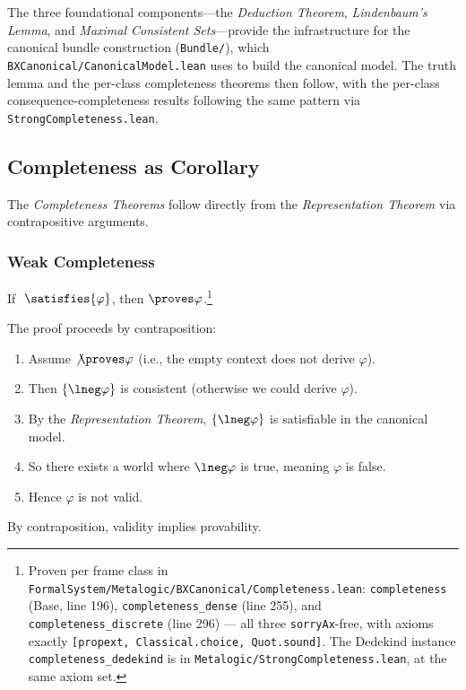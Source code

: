 \documentclass[../BimodalReference.tex]{subfiles}
\begin{document}
The three foundational components---the \emph{Deduction Theorem}, \emph{Lindenbaum's Lemma}, and \emph{Maximal Consistent Sets}---provide the infrastructure for the canonical bundle construction (\texttt{Bundle/}), which \texttt{BXCanonical/CanonicalModel.lean} uses to build the canonical model.
The truth lemma and the per-class completeness theorems then follow, with the per-class consequence-completeness results following the same pattern via \texttt{StrongCompleteness.lean}.

\subsection{Completeness as Corollary}

The \emph{Completeness Theorems} follow directly from the \emph{Representation Theorem} via contrapositive arguments.

\subsubsection{Weak Completeness}

\begin{theorem}
If $~\satisfies{\varphi}$, then $\proves \varphi$.\footnote{Proven per frame class in \texttt{FormalSystem/Metalogic/BXCanonical/Completeness.lean}: \texttt{completeness} (Base, line 196), \texttt{completeness\_dense} (line 255), and \texttt{completeness\_discrete} (line 296) --- all three \texttt{sorryAx}-free, with axioms exactly \texttt{[propext, Classical.choice, Quot.sound]}. The Dedekind instance \texttt{completeness\_dedekind} is in \texttt{Metalogic/StrongCompleteness.lean}, at the same axiom set.}
\end{theorem}

The proof proceeds by contraposition:
\begin{enumerate}
  \item Assume $\not\proves \varphi$ (i.e., the empty context does not derive $\varphi$).
  \item Then $\{\lneg\varphi\}$ is consistent (otherwise we could derive $\varphi$).
  \item By the \emph{Representation Theorem}, $\{\lneg\varphi\}$ is satisfiable in the canonical model.
  \item So there exists a world where $\lneg\varphi$ is true, meaning $\varphi$ is false.
  \item Hence $\varphi$ is not valid.
\end{enumerate}
By contraposition, validity implies provability.
\end{document}
